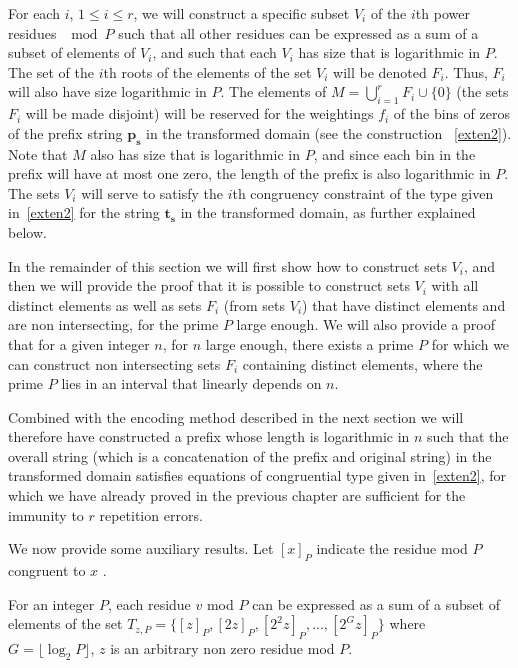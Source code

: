 For each $i$, $1 \leq i \leq r$, we will construct a specific subset
$V_i$ of the $i$th power residues $\mod P$ such that all other
residues can be expressed as a sum of a subset  of elements of
$V_i$, and such that each $V_i$ has size that is logarithmic in $P$.
The set of the $i$th roots of the elements of the set $V_i$ will be
denoted $F_i$. Thus, $F_i$ will also have size logarithmic in $P$.
The elements of $M =\bigcup_{i=1}^r F_i \cup \{0\}$ (the sets $F_i$
will be made disjoint) will be reserved for the weightings $f_i$ of
the bins of zeros of the prefix string $\mathbf{p_s}$ in the
transformed domain (see the construction ~\eqref{exten2}). Note that
$M$ also has size that is logarithmic in $P$, and since each bin in
the prefix will have at most one zero, the length of the prefix is
also logarithmic in $P$. The sets $V_i$ will serve to satisfy the
$i$th congruency constraint of the type given in~\eqref{exten2} for
the string $\mathbf{t_s}$ in the transformed domain, as further
explained below.

In the remainder of this section we will first show how to construct
sets $V_i$, and then we will provide the proof that it is possible
to construct sets $V_i$ with all distinct elements as well as  sets
$F_i$ (from sets $V_i$) that have distinct elements and are non
intersecting, for the prime $P$ large enough. We will also provide a
proof that for a given integer $n$, for $n$ large enough, there
exists a prime $P$ for which we can construct non intersecting sets
$F_i$ containing distinct elements, where the prime $P$ lies in an
interval that linearly depends on $n$.

Combined with the encoding method described in the next section we
will therefore have constructed a prefix whose length is logarithmic
in $n$ such that the overall string (which is a concatenation of the
prefix and original string) in the transformed domain satisfies
equations of congruential type given in~\eqref{exten2}, for which we
have already proved in the previous chapter are sufficient for the
immunity to $r$ repetition errors.



We now provide some auxiliary results. Let $[x]_P$ indicate the
residue mod $P$ congruent to $x$ .

\begin{lemma}\label{generates} For an integer $P$, each residue $v$ mod $P$ can be expressed as a
sum of a subset of elements of the set
$T_{z,P}=\{[z]_P,[2z]_P,[2^2z]_P,...,[2^{G}z]_P\}$ where $G=\lfloor
\log_2 P \rfloor $, $z$ is an arbitrary non zero residue mod $P$.
\end{lemma}

